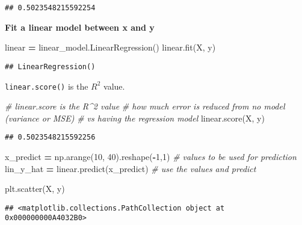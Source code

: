 \documentclass[
]{book}
\newenvironment{Shaded}{\begin{snugshade}}{\end{snugshade}}
\newcommand{\CommentTok}[1]{\textcolor[rgb]{0.56,0.35,0.01}{\textit{#1}}}
\newcommand{\DecValTok}[1]{\textcolor[rgb]{0.00,0.00,0.81}{#1}}
\newcommand{\NormalTok}[1]{#1}
\newcommand{\OperatorTok}[1]{\textcolor[rgb]{0.81,0.36,0.00}{\textbf{#1}}}
\begin{document}
\begin{verbatim}
## 0.5023548215592254
\end{verbatim}

\textbf{Fit a linear model between x and y}

\begin{Shaded}
\begin{Highlighting}[]
\NormalTok{linear }\OperatorTok{=}\NormalTok{ linear\_model.LinearRegression()}
\NormalTok{linear.fit(X, y)}
\end{Highlighting}
\end{Shaded}

\begin{verbatim}
## LinearRegression()
\end{verbatim}

\texttt{linear.score()} is the \(R^2\) value.

\begin{Shaded}
\begin{Highlighting}[]
\CommentTok{\# linear.score is the R\^{}2 value}
\CommentTok{\# how much error is reduced from no model (variance or MSE)}
\CommentTok{\# vs having the regression model}
\NormalTok{linear.score(X, y)}
\end{Highlighting}
\end{Shaded}

\begin{verbatim}
## 0.5023548215592256
\end{verbatim}

\begin{Shaded}
\begin{Highlighting}[]
\NormalTok{x\_predict }\OperatorTok{=}\NormalTok{ np.arange(}\DecValTok{10}\NormalTok{, }\DecValTok{40}\NormalTok{).reshape(}\OperatorTok{{-}}\DecValTok{1}\NormalTok{,}\DecValTok{1}\NormalTok{) }\CommentTok{\# values to be used for prediction}
\NormalTok{lin\_y\_hat }\OperatorTok{=}\NormalTok{ linear.predict(x\_predict) }\CommentTok{\# use the values and predict}
\end{Highlighting}
\end{Shaded}

\begin{Shaded}
\begin{Highlighting}[]
\NormalTok{plt.scatter(X, y)}
\end{Highlighting}
\end{Shaded}

\begin{verbatim}
## <matplotlib.collections.PathCollection object at 0x000000000A4032B0>
\end{verbatim}
\end{document}

